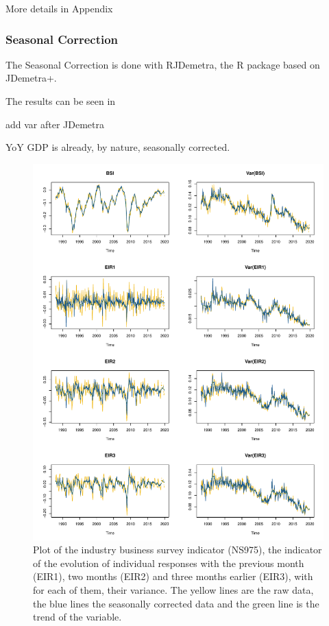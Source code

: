 \documentclass[12pt,a4paper,oneside]{book}
\begin{document}
More details in Appendix

\subsubsection{Seasonal Correction}

The Seasonal Correction is done with RJDemetra, the R package based on JDemetra+. 

The results can be seen in 

add var after JDemetra



YoY GDP is already, by nature, seasonally corrected.


\begin{figure}[H]
    \centering
    \includegraphics[scale=0.75]{Graphs/RJDemetra_plots.pdf}
    \caption{Plot of the industry business survey indicator (NS975), the indicator of the evolution of individual responses with the previous month (EIR1), two months (EIR2) and three months  earlier (EIR3), with for each of them, their variance. The yellow lines are the raw data, the blue lines the seasonally corrected data and the green line is the trend of the variable.}
    \label{fig:seasonal ajusted rjdemetra}
\end{figure}{}
\end{document}
